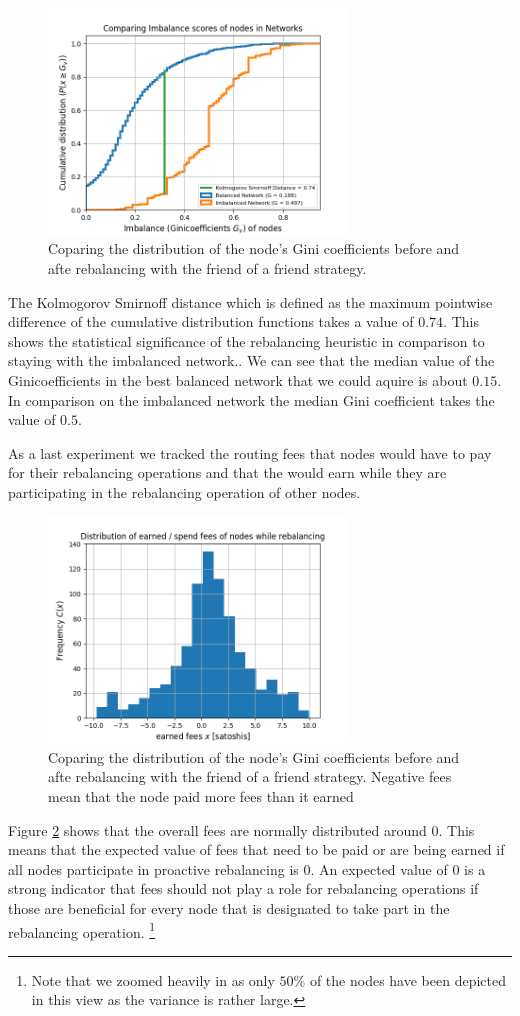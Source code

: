 \documentclass[a4paper]{paper}
\begin{document}
\begin{figure}
 \centering
 \includegraphics[width=8cm]{code/vs/fig/comparison distribution of Ginicoefficients.png}
 \caption{Coparing the distribution of the node's Gini coefficients before and afte rebalancing with the friend of a friend strategy.}
 \label{fig:cdf_gini}
 \end{figure}
 The Kolmogorov Smirnoff distance which is defined as the maximum pointwise difference of the cumulative distribution functions takes a value of $0.74$.
 This shows the statistical significance of the rebalancing heuristic in comparison to staying with the imbalanced network..
 We can see that the median value of the Ginicoefficients in the best balanced network that we could aquire is about $0.15$.
 In comparison on the imbalanced network the median Gini coefficient takes the value of $0.5$.

 As a last experiment we tracked the routing fees that nodes would have to pay for their rebalancing operations and that the would earn while they are participating in the rebalancing operation of other nodes.
 \begin{figure}
 \centering
 \includegraphics[width=8cm]{code/vs/fig/distribution_of_fees.png}
 \caption{Coparing the distribution of the node's Gini coefficients before and afte rebalancing with the friend of a friend strategy. Negative fees mean that the node paid more fees than it earned}
 \label{fig:fees}
 \end{figure}
 Figure \cref{fig:fees} shows that the overall fees are normally distributed around $0$.
 This means that the expected value of fees that need to be paid or are being earned if all nodes participate in proactive rebalancing is $0$.
An expected value of $0$ is a strong indicator that fees should not play a role for rebalancing operations if those are beneficial for every node that is designated to take part in the rebalancing operation.
 \footnote{Note that we zoomed heavily in as only $50\%$ of the nodes have been depicted in this view as the variance is rather large.}
\end{document}
